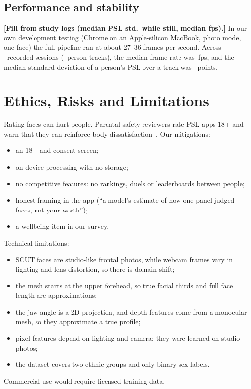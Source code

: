 \documentclass[sigconf,nonacm]{acmart}
\newcommand{\pending}[1]{\textcolor{todo}{\textbf{[#1]}}}
\begin{document}
\subsection{Performance and stability}
\ifdefined\logsPending
\pending{Fill from study logs (median PSL std.\ while still, median fps).} In our own development testing (Chrome on an Apple-silicon MacBook,
photo mode, one face) the full pipeline ran at about 27--36 frames per second.
\else
Across \logSessions\ recorded sessions (\logTracks\ person-tracks), the median frame rate was
\fpsMedian\,fps, and the median standard deviation of a person's PSL over a track was \pslStd\ points.
\fi

\section{Ethics, Risks and Limitations}
\label{sec:ethics}
Rating faces can hurt people. Parental-safety reviewers rate PSL apps 18+ and warn that they can reinforce
body dissatisfaction~\cite{bark2026psl}. Our mitigations:
\begin{itemize}[leftmargin=*,nosep]
  \item an 18+ and consent screen;
  \item on-device processing with no storage;
  \item no competitive features: no rankings, duels or leaderboards between people;
  \item honest framing in the app (``a model's estimate of how one panel judged faces, not your worth'');
  \item a wellbeing item in our survey.
\end{itemize}
Technical limitations:
\begin{itemize}[leftmargin=*,nosep]
  \item SCUT faces are studio-like frontal photos, while webcam frames vary in lighting and lens distortion, so there is
        domain shift;
  \item the mesh starts at the upper forehead, so true facial thirds and full face length are approximations;
  \item the jaw angle is a 2D projection, and depth features come from a monocular mesh, so they approximate a true profile;
  \item pixel features depend on lighting and camera; they were learned on studio photos;
  \item the dataset covers two ethnic groups and only binary sex labels.
\end{itemize}
Commercial use would require licensed training data.
\end{document}
